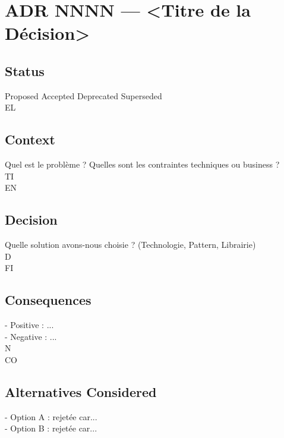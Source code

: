 \documentclass[12pt,landscape,a4paper]{article}
\begin{document}
\section*{ADR NNNN --- \textless{}Titre de la Décision\textgreater{}}
\vspace{0.5em}
\vspace{0.5em}
\subsection*{Status}
Proposed \textbar{} Accepted \textbar{} Deprecated \textbar{} Superseded\\
\vspace{0.5em}
\vspace{0.5em}
\vspace{0.5em}
\vspace{0.5em}
EL\\
\subsection*{Context}
Quel est le problème ? Quelles sont les contraintes techniques ou business ?\\
\vspace{0.5em}
\vspace{0.5em}
\vspace{0.5em}
\vspace{0.5em}
TI\\
EN\\
\subsection*{Decision}
Quelle solution avons-nous choisie ? (Technologie, Pattern, Librairie)\\
\vspace{0.5em}
\vspace{0.5em}
\vspace{0.5em}
\vspace{0.5em}
D\\
FI\\
\subsection*{Consequences}
- Positive : ...\\
- Negative : ...\\
N\\
CO\\
\subsection*{Alternatives Considered}
- Option A : rejetée car...\\
- Option B : rejetée car...\\
\vspace{0.5em}
\vspace{0.5em}
\end{document}
